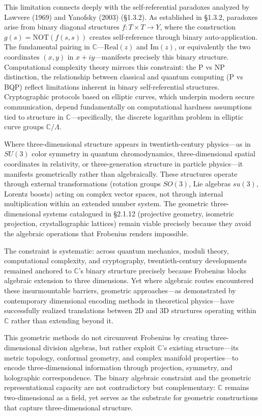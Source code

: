 This limitation connects deeply with the self-referential paradoxes analyzed by Lawvere (1969) and Yanofsky (2003) \cite{Lawvere1969, Yanofsky2003} (\S 1.3.2). As established in \S 1.3.2, paradoxes arise from binary diagonal structures $f: T \times T \to Y$, where the construction $g(s) = \text{NOT}(f(s,s))$ creates self-reference through binary auto-application. The fundamental pairing in $\mathbb{C}$—$\text{Real}(z)$ and $\text{Im}(z)$, or equivalently the two coordinates $(x,y)$ in $x + iy$—manifests precisely this binary structure. Computational complexity theory mirrors this constraint: the P vs NP distinction, the relationship between classical and quantum computing (P vs BQP) reflect limitations inherent in binary self-referential structures. Cryptographic protocols based on elliptic curves, which underpin modern secure communication, depend fundamentally on computational hardness assumptions tied to structure in $\mathbb{C}$—specifically, the discrete logarithm problem in elliptic curve groups $\mathbb{C}/\Lambda$.

    Where three-dimensional structure appears in twentieth-century physics—as in $SU(3)$ color symmetry in quantum chromodynamics, three-dimensional spatial coordinates in relativity, or three-generation structure in particle physics—it manifests geometrically rather than algebraically. These structures operate through external transformations (rotation groups $SO(3)$, Lie algebras $su(3)$, Lorentz boosts) acting on complex vector spaces, not through internal multiplication within an extended number system. The geometric three-dimensional systems catalogued in \S 2.1.12 (projective geometry, isometric projection, crystallographic lattices) remain viable precisely because they avoid the algebraic operations that Frobenius renders impossible.

    The constraint is systematic: across quantum mechanics, moduli theory, computational complexity, and cryptography, twentieth-century developments remained anchored to $\mathbb{C}$'s binary structure precisely because Frobenius blocks algebraic extension to three dimensions. Yet where algebraic routes encountered these insurmountable barriers, geometric approaches—as demonstrated by contemporary dimensional encoding methods in theoretical physics—have successfully realized translations between 2D and 3D structures operating within $\mathbb{C}$ rather than extending beyond it.

    This geometric methods do not circumvent Frobenius by creating three-dimensional division algebras, but rather exploit $\mathbb{C}$'s existing structure—its metric topology, conformal geometry, and complex manifold properties—to encode three-dimensional information through projection, symmetry, and holographic correspondence. The binary algebraic constraint and the geometric representational capacity are not contradictory but complementary: $\mathbb{C}$ remains two-dimensional as a field, yet serves as the substrate for geometric constructions that capture three-dimensional structure.


